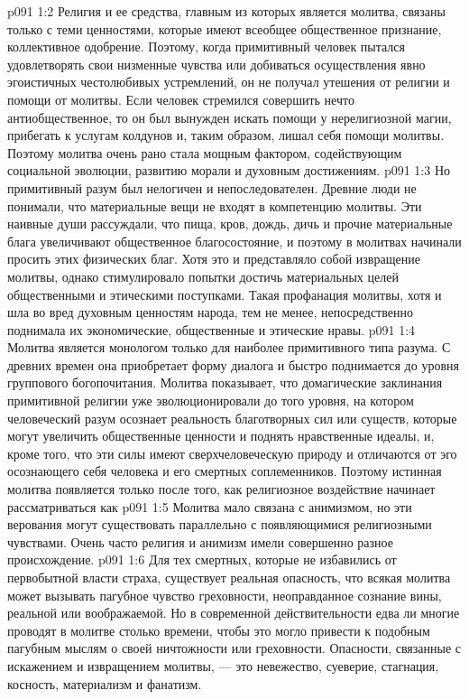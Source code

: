 \vs p091 1:2 \pc Религия и ее средства, главным из которых является молитва, связаны только с теми ценностями, которые имеют всеобщее общественное признание, коллективное одобрение. Поэтому, когда примитивный человек пытался удовлетворять свои низменные чувства или добиваться осуществления явно эгоистичных честолюбивых устремлений, он не получал утешения от религии и помощи от молитвы. Если человек стремился совершить нечто антиобщественное, то он был вынужден искать помощи у нерелигиозной магии, прибегать к услугам колдунов и, таким образом, лишал себя помощи молитвы. Поэтому молитва очень рано стала мощным фактором, содействующим социальной эволюции, развитию морали и духовным достижениям.
\vs p091 1:3 Но примитивный разум был нелогичен и непоследователен. Древние люди не понимали, что материальные вещи не входят в компетенцию молитвы. Эти наивные души рассуждали, что пища, кров, дождь, дичь и прочие материальные блага увеличивают общественное благосостояние, и поэтому в молитвах начинали просить этих физических благ. Хотя это и представляло собой извращение молитвы, однако стимулировало попытки достичь материальных целей общественными и этическими поступками. Такая профанация молитвы, хотя и шла во вред духовным ценностям народа, тем не менее, непосредственно поднимала их экономические, общественные и этические нравы.
\vs p091 1:4 Молитва является монологом только для наиболее примитивного типа разума. С древних времен она приобретает форму диалога и быстро поднимается до уровня группового богопочитания. Молитва показывает, что домагические заклинания примитивной религии уже эволюционировали до того уровня, на котором человеческий разум осознает реальность благотворных сил или существ, которые могут увеличить общественные ценности и поднять нравственные идеалы, и, кроме того, что эти силы имеют сверхчеловеческую природу и отличаются от эго осознающего себя человека и его смертных соплеменников. Поэтому истинная молитва появляется только после того, как религиозное воздействие начинает рассматриваться как 
\vs p091 1:5 \pc Молитва мало связана с анимизмом, но эти верования могут существовать параллельно с появляющимися религиозными чувствами. Очень часто религия и анимизм имели совершенно разное происхождение.
\vs p091 1:6 \pc Для тех смертных, которые не избавились от первобытной власти страха, существует реальная опасность, что всякая молитва может вызывать пагубное чувство греховности, неоправданное сознание вины, реальной или воображаемой. Но в современной действительности едва ли многие проводят в молитве столько времени, чтобы это могло привести к подобным пагубным мыслям о своей ничтожности или греховности. Опасности, связанные с искажением и извращением молитвы, --- это невежество, суеверие, стагнация, косность, материализм и фанатизм.
